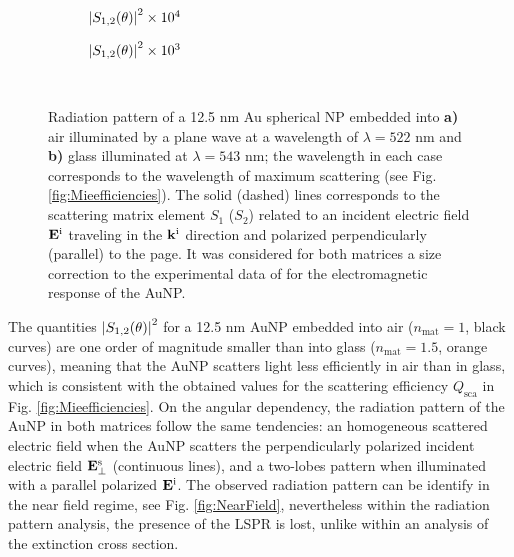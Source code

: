 \begin{figure}[t!]
	\def\svgwidth{.9\textwidth} \small\centering
		\vspace*{3.25em}
		\hspace*{-.25\textwidth}
	\begin{subfigure}{.4\textwidth}%
		\caption{$\abs{S_{1,2}(\theta)}^2\times 10^4$} \label{fig:ScatteringMaps:a}%
		\end{subfigure}%
	\begin{subfigure}{.45\textwidth}%
		\caption{$\abs{S_{1,2}(\theta)}^2\times 10^3$}\label{fig:ScatteringMaps:b}%
		\end{subfigure}%
	\vspace*{-6.25em}\\
	\vspace*{-.5em}
	\caption[Radiation Pattern of a 12.5 nm Au Spherical NP embedded into Air and Glass]{Radiation pattern of a 12.5 nm Au spherical NP embedded into \textbf{a)} air illuminated by a plane wave at a wavelength of $\lambda = 522$ nm and \textbf{b)} glass illuminated at $\lambda = 543$ nm; the wavelength in each case corresponds to the wavelength of maximum scattering (see Fig. \ref{fig:Mieefficiencies}). The solid (dashed) lines corresponds to the scattering matrix element $S_1$ ($S_2$) related to an incident electric field $\vb{E}^\text{i}$ traveling in the $\vb{k}^\text{i}$ direction  and polarized perpendicularly (parallel) to the page. It was considered for both matrices a size correction to the experimental data of \citeauthor{johnson_optical_1972} \cite{johnson_optical_1972} for the electromagnetic response of the AuNP.}
	\label{fig:ScatteringMaps}
 \end{figure}

The quantities $\abs{S_{1,2}(\theta)}^2$ for a 12.5 nm AuNP embedded into air ($n_\text{mat} = 1$, black curves) are one order of magnitude smaller  than into glass ($n_\text{mat} = 1.5$, orange curves), meaning that the AuNP scatters light less efficiently in air than in glass, which is consistent with the obtained values for the scattering efficiency $Q_\text{sca}$ in Fig. \ref{fig:Mieefficiencies}. On the angular dependency, the radiation pattern of the AuNP in both matrices follow the same tendencies: an homogeneous scattered electric field when the AuNP scatters the perpendicularly polarized incident electric field  $\vb{E}^\text{s}_\perp$ (continuous lines), and a two-lobes pattern when illuminated with a parallel polarized $\vb{E}^\text{i}$. The observed radiation pattern can be identify in the near field regime, see Fig. \ref{fig:NearField}, nevertheless within the radiation pattern analysis, the presence of the LSPR is lost, unlike within an analysis of the extinction cross section.
